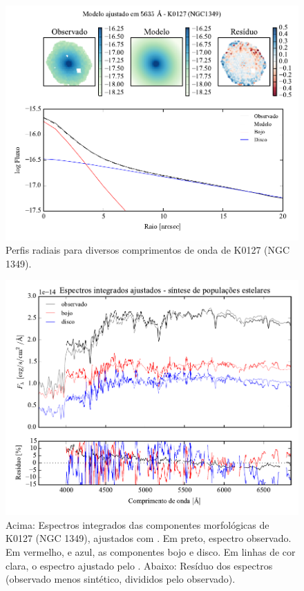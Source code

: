 \begin{figure}
	\includegraphics[page=5]{figuras-decomp/K0127_sample006a}
	\caption[Perfis radiais para diversos comprimentos de onda de K0127 (NGC 1349)]
	{Perfis radiais para diversos comprimentos de onda de K0127 (NGC 1349).}
	\label{fig:decompRadprofSpec:K0127}
\end{figure}

\begin{figure}
	\includegraphics[page=3,width=\textwidth]{figuras/sample006a_synthesis}
	\caption[Espectros ajustados com \starlight das componentes morfológicas de
	K0127 (NGC 1349)]
	{Acima: Espectros integrados das componentes morfológicas de
	K0127 (NGC 1349), ajustados com \starlight. Em preto, espectro observado. Em
	vermelho, e azul, as componentes bojo e disco. Em linhas de cor clara, o
	espectro ajustado pelo \starlight. Abaixo: Resíduo dos espectros (observado
	menos sintético, divididos pelo observado).}
	\label{fig:decompSintese:K0127}
\end{figure}

